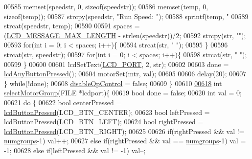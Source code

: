 \begin{DoxyCode}
{{{{{{{{{00585         memset(speedstr, 0, \textcolor{keyword}{sizeof}(speedstr));
00586         memset(temp, 0, \textcolor{keyword}{sizeof}(temp));
00587         strcpy(speedstr, \textcolor{stringliteral}{"Run Speed: "});
00588         sprintf(temp, \textcolor{stringliteral}{"%
00589         strcat(speedstr, temp);
00590 
00591         spaces = (\hyperlink{lcdmsg_8h_abe4c4b70fc6f44ae3680e5b2c68cdd00}{LCD\_MESSAGE\_MAX\_LENGTH} - strlen(speedstr))/2;
00592         strcpy(str, \textcolor{stringliteral}{""});
00593         \textcolor{keywordflow}{for}(\textcolor{keywordtype}{int} i = 0; i < spaces; i++)\{
00594             strcat(str, \textcolor{stringliteral}{" "});
00595         \}
00596         strcat(str, speedstr);
00597         \textcolor{keywordflow}{for}(\textcolor{keywordtype}{int} i = 0; i < spaces; i++)\{
00598             strcat(str, \textcolor{stringliteral}{" "});
00599         \}
00600 
00601         lcdSetText(\hyperlink{lcdmsg_8h_abcf42bd88b3c36193f301ca25b033875}{LCD\_PORT}, 2, str);
00602 
00603         done = \hyperlink{lcddiag_8h_a0592813f995bfeeadb9bee923833ed35}{lcdAnyButtonPressed}();
00604         motorSet(mtr, val);
00605 
00606         delay(20);
00607     \} \textcolor{keywordflow}{while}(!done);
00608     \hyperlink{lcddiag_8c_a0f0b335cd078d025d6fb720eb3bf6437}{disableOpControl} = \textcolor{keyword}{false};
00609 \}
00610 
\hypertarget{lcddiag_8c_source.tex_l00618}{}\hyperlink{lcddiag_8c_a45205137e2aea6d387568cabe3072002}{00618} \textcolor{keywordtype}{int} \hyperlink{lcddiag_8c_a45205137e2aea6d387568cabe3072002}{selectMotorGroup}(FILE *lcdport)\{
00619     \textcolor{keywordtype}{bool} done = \textcolor{keyword}{false};
00620     \textcolor{keywordtype}{int} val = 0;
00621     \textcolor{keywordflow}{do} \{
00622         \textcolor{keywordtype}{bool} centerPressed = \hyperlink{lcddiag_8h_a74e4c744db49f9b7b645095575e152ad}{lcdButtonPressed}(LCD\_BTN\_CENTER);
00623         \textcolor{keywordtype}{bool} leftPressed = \hyperlink{lcddiag_8h_a74e4c744db49f9b7b645095575e152ad}{lcdButtonPressed}(LCD\_BTN\_LEFT);
00624         \textcolor{keywordtype}{bool} rightPressed = \hyperlink{lcddiag_8h_a74e4c744db49f9b7b645095575e152ad}{lcdButtonPressed}(LCD\_BTN\_RIGHT);
00625 
00626         \textcolor{keywordflow}{if}(rightPressed && val != \hyperlink{lcddiag_8c_a205f1cedec1664555276e0a71a1c87d8}{numgroups}-1) val++;
00627         \textcolor{keywordflow}{else} \textcolor{keywordflow}{if}(rightPressed && val == \hyperlink{lcddiag_8c_a205f1cedec1664555276e0a71a1c87d8}{numgroups}-1) val = -1;
00628         \textcolor{keywordflow}{else} \textcolor{keywordflow}{if}(leftPressed && val != -1) val--;
}}}}}}}}}}
\end{DoxyCode}
